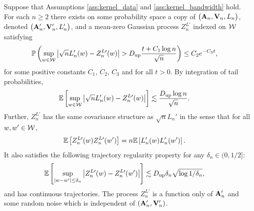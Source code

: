 \begin{lemma}
  \label{lem:app_strong_approx_Ln}

  Suppose that Assumptions
  \ref{ass:kernel_data}
  and
  \ref{ass:kernel_bandwidth} hold.
  For each $n \geq 2$
  there exists
  on some probability space
  a copy of $\big(\mathbf{A}_n, \mathbf{V}_n, L_n\big)$,
  denoted $\big(\mathbf{A}_n', \mathbf{V}_n', L_n'\big)$,
  and a mean-zero Gaussian process
  $Z^{L\prime}_n$
  indexed on $\mathcal{W}$ satisfying
  \begin{align*}
    \mathbb{P}\left(
      \sup_{w \in \mathcal{W}}
      \big| \sqrt{n} L'_n(w) -  Z_n^{L\prime}(w)\big|
      > D_{\textup{up}}
      \frac{t + C_1 \log n}{\sqrt{n}}
    \right)
    &\leq C_2 e^{-C_3 t},
  \end{align*}
  for some positive constants
  $C_1$, $C_2$, $C_3$
  and for all $t > 0$.
  By integration of tail probabilities,
  \begin{align*}
    \mathbb{E}\left[
      \sup_{w \in \mathcal{W}}
      \big| \sqrt{n} L_n'(w) -  Z_n^{L\prime}(w)\big|
    \right]
    &\lesssim
    \frac{D_{\textup{up}} \log n}{\sqrt{n}}.
  \end{align*}
  Further,
  $Z_n^{L\prime}$ has the same covariance structure as
  $\sqrt{n} L_n'$ in the sense that for all $w, w' \in \mathcal{W}$,
  \begin{align*}
    \mathbb{E}\left[
      Z_n^{L\prime}(w)
      Z_n^{L\prime}(w')
    \right]
    &=
    n
    \mathbb{E}\left[
      L_n'(w)
      L_n'(w')
    \right].
  \end{align*}
  It also satisfies the following
  trajectory regularity property
  for any $\delta_n \in (0, 1/2]$:
  \begin{align*}
    \mathbb{E}\left[
      \sup_{|w-w'| \leq \delta_n}
      \big|
      Z_n^{L\prime}(w)
      - Z_n^{L\prime}(w')
      \big|
    \right]
    &\lesssim
    D_{\textup{up}}
    \delta_n \sqrt{\log 1/\delta_n},
  \end{align*}
  and has continuous trajectories.
  The process $Z_n^{L\prime}$
  is a function only of $\mathbf{A}_n'$
  and some random noise
  which is independent of $(\mathbf{A}_n', \mathbf{V}_n')$.

\end{lemma}

